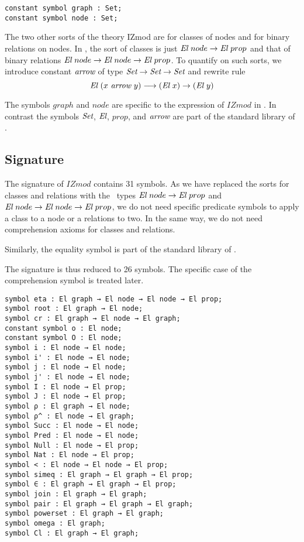 \documentclass[a4paper]{article}
\begin{document}
\begin{lstlisting}
constant symbol graph : Set;
constant symbol node : Set;
\end{lstlisting}

The two other sorts of the theory IZmod are for classes of nodes and
for binary relations on nodes.  In \dedukti, the sort of classes is
just ${\mbox{\it El}}~node \rightarrow {\mbox{\it El}}~prop$ and that of binary relations
${\mbox{\it El}}~node \rightarrow {\mbox{\it El}}~node \rightarrow {\mbox{\it El}}~prop$. To quantify on such sorts, we introduce constant ${\mbox{\it arrow}} $ of type
$\mbox{\it Set} \rightarrow \mbox{\it Set} \rightarrow \mbox{\it Set}$ and rewrite rule
$${\mbox{\it El}}~(x~{\mbox{\it arrow}}~y) \longrightarrow ({\mbox{\it El}}~x) \rightarrow ({\mbox{\it El}}~y)$$

The symbols $graph$ and $node$ are specific to the
expression of $IZmod$ in \dedukti. In contrast the symbols $\mbox{\it Set}$,
${\mbox{\it El}}$, $prop$, and ${\mbox{\it arrow}}$ are part of the standard library of 
\dedukti.

\subsection{Signature}

The signature of $IZmod$ contains 31 symbols. As we have replaced the
sorts for classes and relations with the \dedukti \ types
${\mbox{\it El}}~node \rightarrow {\mbox{\it El}}~prop$ and ${\mbox{\it El}}~node \rightarrow {\mbox{\it El}}~node \rightarrow {\mbox{\it El}}~prop$, we do not need specific predicate symbols to apply a class to a node or a relations to two. In the same way, we do not need comprehension axioms for classes and relations. 

Similarly, the equality symbol is part of the standard library of \dedukti.

The signature is thus reduced to 26 symbols. The specific case of the comprehension symbol is treated later.

\begin{lstlisting}
symbol eta : El graph → El node → El node → El prop;
symbol root : El graph → El node;
symbol cr : El graph → El node → El graph;
constant symbol o : El node;
constant symbol O : El node;
symbol i : El node → El node;
symbol i' : El node → El node;
symbol j : El node → El node;
symbol j' : El node → El node;
symbol I : El node → El prop;
symbol J : El node → El prop;
symbol ρ : El graph → El node;
symbol ρ^ : El node → El graph;
symbol Succ : El node → El node;
symbol Pred : El node → El node;
symbol Null : El node → El prop;
symbol Nat : El node → El prop;
symbol < : El node → El node → El prop;
symbol simeq : El graph → El graph → El prop;
symbol ∈ : El graph → El graph → El prop;
symbol join : El graph → El graph;
symbol pair : El graph → El graph → El graph;
symbol powerset : El graph → El graph;
symbol omega : El graph;
symbol Cl : El graph → El graph;
\end{lstlisting}
\end{document}
